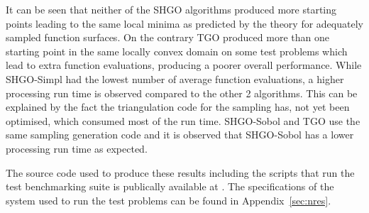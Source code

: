 It can be seen that neither of the SHGO algorithms produced more starting points leading to the same local minima as predicted by the theory for adequately sampled function surfaces. On the contrary TGO produced more than one starting point in the same locally convex domain on some test problems which lead to extra function evaluations, producing a poorer overall performance. While SHGO-Simpl had the lowest number of average function evaluations, a higher processing run time is observed compared to the other 2 algorithms. This can be explained by the fact the triangulation code for the sampling has, not yet been optimised, which consumed most of the run time. SHGO-Sobol and TGO use the same sampling generation code and it is observed that SHGO-Sobol has a lower processing run time as expected.


The source code used to produce these results including the scripts that run the test benchmarking suite is publically available at \citet{SHGOpy}. The specifications of the system used to run the test problems can be found in Appendix~\ref{sec:nres}.



